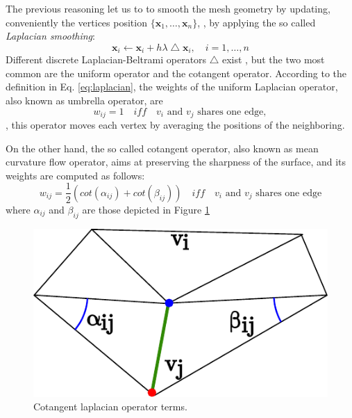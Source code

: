The previous reasoning let us to to smooth the mesh geometry by updating, conveniently the vertices position $\{\mathbf{x}_1, \dots, \mathbf{x}_n\}$, \ie, by applying the so called \emph{Laplacian smoothing}:
\begin{equation}
\mathbf{x}_i \leftarrow  \mathbf{x}_i  + h \lambda \bigtriangleup \mathbf{x}_i , \quad i = 1, \dots, n
\end{equation}
Different discrete Laplacian-Beltrami operators $\bigtriangleup$ exist \cite{wardetzky2007discrete,sorkine2005laplacian}, but the two most common are the uniform operator and the cotangent operator.
According to the definition in Eq. \eqref{eq:laplacian}, the weights of the uniform Laplacian operator, also known as umbrella operator, are 
\begin{equation}
w_{ij} = 1 \quad iff \quad  \text{$v_i$ and $v_j$ shares one edge},
\end{equation}
\ie, this operator moves each vertex by averaging the positions of the neighboring.

On the other hand, the so called cotangent operator, also known as mean curvature flow operator, aims at preserving the sharpness of the surface, and its weights are computed as follows:
\begin{equation}
w_{ij} = \frac{1}{2} (cot(\alpha_{ij}) + cot(\beta_{ij})) \quad iff \quad \text{$v_i$ and $v_j$ shares one edge}
\end{equation}
where $\alpha_{ij}$ and $\beta_{ij}$ are those depicted in Figure \ref{fig:cotang}
\begin{figure}[t]
  \centering
  \includegraphics[width=0.7\columnwidth]{./img/laplacian}
  \caption{Cotangent laplacian operator terms.}
  \label{fig:cotang}
\end{figure}


